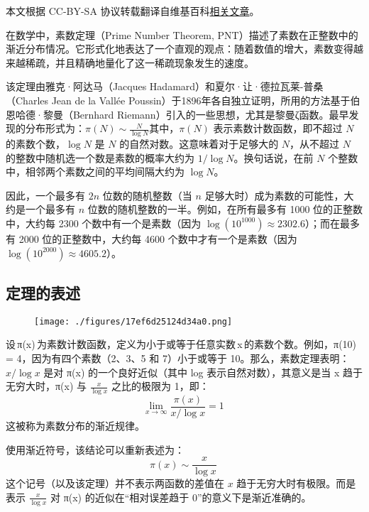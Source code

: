 
本文根据 CC-BY-SA 协议转载翻译自维基百科\href{https://en.wikipedia.org/wiki/Prime_number_theorem}{相关文章}。

在数学中，素数定理（Prime Number Theorem, PNT）描述了素数在正整数中的渐近分布情况。它形式化地表达了一个直观的观点：随着数值的增大，素数变得越来越稀疏，并且精确地量化了这一稀疏现象发生的速度。

该定理由雅克·阿达马（Jacques Hadamard）和夏尔·让·德拉瓦莱-普桑（Charles Jean de la Vallée Poussin）于1896年各自独立证明，所用的方法基于伯恩哈德·黎曼（Bernhard Riemann）引入的一些思想，尤其是黎曼ζ函数。最早发现的分布形式为：$\pi(N) \sim \frac{N}{\log N}$其中，$\pi(N)$ 表示素数计数函数，即不超过 $N$ 的素数个数，$\log N$ 是 $N$ 的自然对数。这意味着对于足够大的 $N$，从不超过 $N$ 的整数中随机选一个数是素数的概率大约为 $1 / \log N$。换句话说，在前 $N$ 个整数中，相邻两个素数之间的平均间隔大约为 $\log N$。

因此，一个最多有 $2n$ 位数的随机整数（当 $n$ 足够大时）成为素数的可能性，大约是一个最多有 $n$ 位数的随机整数的一半。例如，在所有最多有 1000 位的正整数中，大约每 2300 个数中有一个是素数（因为 $\log(10^{1000}) \approx 2302.6$）；而在最多有 2000 位的正整数中，大约每 4600 个数中才有一个是素数（因为 $\log(10^{2000}) \approx 4605.2$）。
\subsection{定理的表述}
\begin{figure}[ht]
\centering
\texttt{[image: ./figures/17ef6d25124d34a0.png]}
\caption{} \label{fig_SDL_1}
\end{figure}
设 π(x) 为素数计数函数，定义为小于或等于任意实数 x 的素数个数。例如，π(10) = 4，因为有四个素数（2、3、5 和 7）小于或等于 10。那么，素数定理表明：$x/\log x$
是对 π(x) 的一个良好近似（其中 log 表示自然对数），其意义是当 x 趋于无穷大时，π(x) 与 $\frac{x}{\log x}$ 之比的极限为 1，即：
$$
\lim_{x \to \infty} \frac{\pi(x)}{x / \log x} = 1~
$$
这被称为素数分布的渐近规律。

使用渐近符号，该结论可以重新表述为：
$$
\pi(x) \sim \frac{x}{\log x}~
$$
这个记号（以及该定理）并不表示两函数的差值在 $x$ 趋于无穷大时有极限。而是表示 $\frac{x}{\log x}$ 对 π(x) 的近似在“相对误差趋于 0”的意义下是渐近准确的。

